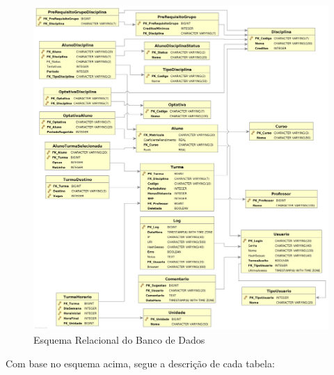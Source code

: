 \documentclass[graduacao,brazil]{ThesisPUC}
\begin{document}
\begin{figure}[H]
    \centering
    \includegraphics[width=0.98\linewidth]{img/dbvisualizer.png}
    \caption{Esquema Relacional do Banco de Dados}
\end{figure}

Com base no esquema acima, segue a descrição de cada tabela:
\end{document}
